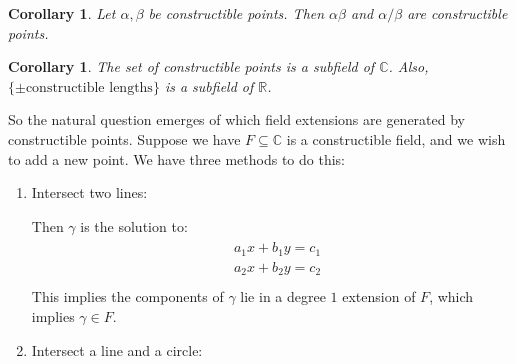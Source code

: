\documentclass{article}
\theoremstyle{plain}
\newtheorem{cor}[thm]{Corollary}
\theoremstyle{definition}
\newcommand{\R}{\mathbb{R}}
\newcommand{\C}{\mathbb{C}}
\begin{document}
\begin{cor}
    Let $\alpha, \beta$ be constructible points. Then $\alpha\beta$ and $\alpha/\beta$ are constructible points.
\end{cor}

\begin{cor}
    The set of constructible points is a subfield of $\C$. Also, $\{ \pm \text{constructible lengths}\}$ is a subfield of $\R$. 
\end{cor}

\noindent So the natural question emerges of which field extensions are generated by constructible points. Suppose we have $F \subseteq \C$ is a constructible field, and we wish to add a new point. We have three methods to do this: \begin{enumerate}
    \item Intersect two lines: 
        \begin{center}
        \end{center}

    Then $\gamma$ is the solution to: \begin{multline}
        \begin{aligned}
        & a_1x + b_1y = c_1 \\
        & a_2x + b_2y = c_2\\
    \end{aligned}
    \end{multline}
    This implies the components of $\gamma$ lie in a degree $1$ extension of $F$, which implies $\gamma \in F$. 
    \item Intersect a line and a circle:
    \begin{center}
        \begin{tikzpicture}[scale=2]


\end{tikzpicture}
\end{center}
\end{enumerate}
\end{document}
